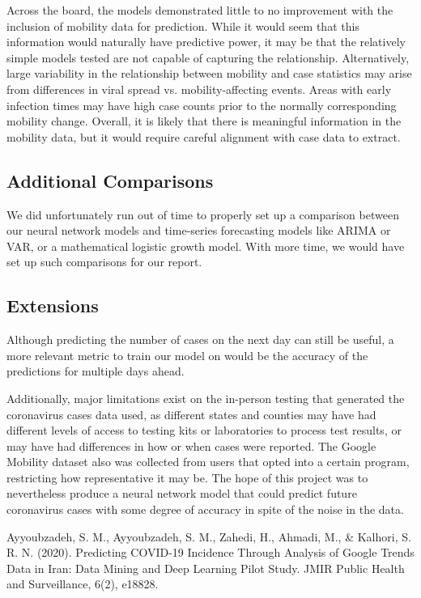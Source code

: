 ﻿\documentclass{article}
\begin{document}
\begin{multicols}{2}
Across the board, the models demonstrated little to no improvement with the
inclusion of mobility data for prediction.
While it would seem that this information would naturally have predictive power,
it may be that the relatively simple models tested are not capable of capturing
the relationship.
Alternatively, large variability in the relationship between mobility and case
statistics may arise from differences in viral spread vs. mobility-affecting
events.
Areas with early infection times may have high case counts prior to the normally
corresponding mobility change.
Overall, it is likely that there is meaningful information in the mobility data,
but it would require careful alignment with case data to extract.

\subsection*{Additional Comparisons}

We did unfortunately run out of time to properly set up a comparison between our
neural network models and time-series forecasting models like ARIMA or VAR, or a
mathematical logistic growth model. With more time, we would have set up such
comparisons for our report.

\subsection*{Extensions}

Although predicting the number of cases on the next day can still be useful, a
more relevant metric to train our model on would be the accuracy of the
predictions for multiple days ahead.

Additionally, major limitations exist on the in-person testing that generated
the coronavirus cases data used, as different states and counties may have had
different levels of access to testing kits or laboratories to process test
results, or may have had differences in how or when cases were reported. The
Google Mobility dataset also was collected from users that opted into a certain
program, restricting how representative it may be. The hope of this project was
to nevertheless produce a neural network model that could predict future
coronavirus cases with some degree of accuracy in spite of the noise in the
data.


\begin{thebibliography}{7}

\bibitem{}
Ayyoubzadeh, S. M., Ayyoubzadeh, S. M., Zahedi, H., Ahmadi, M., \& Kalhori, S. R.
N. (2020). Predicting COVID-19 Incidence Through Analysis of Google Trends Data
in Iran: Data Mining and Deep Learning Pilot Study. JMIR Public Health and
Surveillance, 6(2), e18828.


\end{thebibliography}
\end{multicols}
\end{document}
